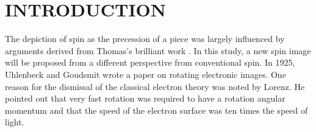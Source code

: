 \documentclass[%
 reprint,
 amsmath,amssymb,
 aps,
]{revtex4-1}
\numberwithin{equation}{section}%
\begin{document}
\begin{abstract}
    \end{abstract}
    \maketitle


\section{\label{sec:INTRODUCTION}INTRODUCTION}


The depiction of spin as the precession of a piece was largely influenced by arguments derived from Thomas's brilliant work \cite{Thomas}. In this study, a new spin image will be proposed from a different perspective from conventional spin. In 1925, Uhlenbeck and Goudsmit wrote a paper \cite{Uhlenbeck} on rotating electronic images. One reason for the dismissal of the classical electron theory was noted by Lorenz. He pointed out that very fast rotation was required to have a rotation angular momentum and that the speed of the electron surface was ten times the speed of light.
\end{document}
